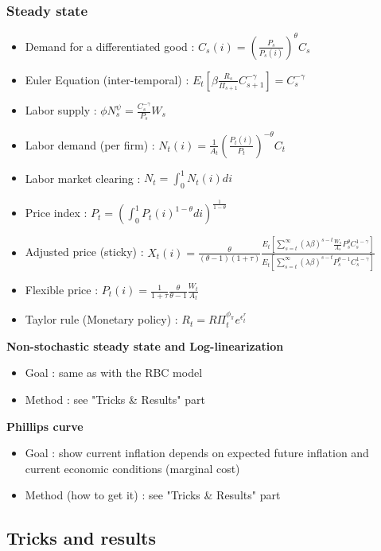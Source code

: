 \documentclass{article}
\begin{document}
\subsubsection{Steady state}
\begin{systembox}
    \begin{itemize}
        \item Demand for a differentiated good : $C_s(i) = (\frac{P_s}{P_s(i)})^{\theta}C_s$
        \item Euler Equation (inter-temporal) : $E_t\left[\beta\frac{R_s}{\Pi_{s+1}}C_{s+1}^{-\gamma}\right] = C_s^{-\gamma}$
        \item Labor supply : $\phi N_s^{\psi}  = \frac{C_s^{-\gamma}}{P_s}W_s$
        \item Labor demand (per firm) : $N_t(i) = \frac{1}{A_t}(\frac{P_t(i)}{P_t})^{-\theta}C_t$
        \item Labor market clearing : $N_t = \int_0^1N_t(i)di$
        \item Price index : $P_t = (\int_0^1P_t(i)^{1-\theta}di)^{\frac{1}{1-\theta}}$
        \item Adjusted price (sticky) : $X_t(i) = \frac{\theta}{(\theta-1)(1+\tau)}\frac{E_t[\sum_{s=t}^\infty(\lambda\beta)^{s-t}\frac{W_s}{A_s}P_s^{\theta}C_s^{1-\gamma}]}{E_t[\sum_{s=t}^{\infty}(\lambda\beta)^{s-t}P_s^{\theta-1}C_s^{1-\gamma}]}$
        \item Flexible price : $P_t(i) = \frac{1}{1+\tau}\frac{\theta}{\theta-1}\frac{W_t}{A_t}$
        \item Taylor rule (Monetary policy) : $R_t=R\Pi_t^{\phi_\pi}e^{\epsilon_t^r}$
    \end{itemize}
\end{systembox}
\textbf{Non-stochastic steady state and Log-linearization}
\begin{itemize}
    \item Goal : same as with the RBC model
    \item Method : see "Tricks \& Results" part
\end{itemize}
\textbf{Phillips curve}
\begin{itemize}
    \item Goal : show current inflation depends on expected future inflation and current economic conditions (marginal cost)
    \item Method (how to get it) : see "Tricks \& Results" part
\end{itemize}



\subsection{Tricks and results}
\end{document}
